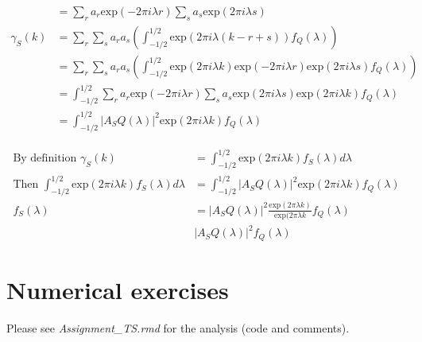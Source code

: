 \documentclass[10pt,a4paper]{article}
\begin{document}
\begin{enumerate}
\begin{enumerate}
\begin{align*}
			&= \sum_{r} a_r \text{exp}(-2\pi i \lambda r) \sum_{s} a_s \text{exp}(2\pi i \lambda s) \\			
			\gamma_{S}(k) &= \sum_{r} \sum_{s} a_r a_s \left(\int_{-1/2}^{1/2} \text{exp}(2\pi i \lambda (k-r+s)) f_Q(\lambda) \right) \\			
			&= \sum_{r} \sum_{s} a_r a_s  \left(\int_{-1/2}^{1/2} \text{exp}(2\pi i \lambda k) \text{exp}(-2\pi i \lambda r) \text{exp}(2\pi i \lambda s) f_Q(\lambda) \right) \\			
			&= \int_{-1/2}^{1/2} \sum_{r} a_r \text{exp}(-2\pi i \lambda r) \sum_{s} a_s \text{exp}(2\pi i \lambda s) \text{exp}(2\pi i \lambda k) f_Q(\lambda) \\			
			&= \int_{-1/2}^{1/2} |A_SQ(\lambda)|^2 \text{exp}(2\pi i \lambda k) f_Q(\lambda)
		\end{align*}
	
		\begin{align*}			
			\text{By definition   } \gamma_{S}(k) &= \int_{-1/2}^{1/2} \text{exp}(2\pi i \lambda k) f_S(\lambda) d\lambda \\
			\text{Then   } \int_{-1/2}^{1/2} \text{exp}(2\pi i \lambda k) f_S(\lambda) d\lambda &= \int_{-1/2}^{1/2} |A_SQ(\lambda)|^2 \text{exp}(2\pi i \lambda k) f_Q(\lambda)\\
			f_S(\lambda) &= |A_SQ(\lambda)|^2 \frac{\text{exp}(2\pi \lambda k)}{\text{exp}(2\pi \lambda k} f_Q(\lambda) \\
			&|A_SQ(\lambda)|^2 f_Q(\lambda)
		\end{align*}
	\end{enumerate}
\end{enumerate}
	\section{Numerical exercises}
	Please see \textit{Assignment\_TS.rmd} for the analysis (code and comments).
\end{document}

